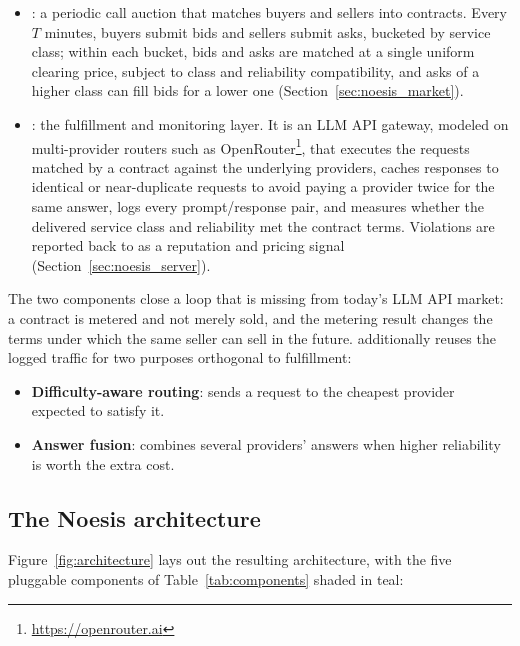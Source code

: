 \begin{itemize}
  \item \textbf{\NoesisMarket}: a periodic call auction that matches buyers
    and sellers into contracts. Every $T$ minutes, buyers submit bids and
    sellers submit asks, bucketed by service class; within each bucket, bids
    and asks are matched at a single uniform clearing price, subject to class
    and reliability compatibility, and asks of a higher class can fill bids
    for a lower one (Section~\ref{sec:noesis_market}).

  \item \textbf{\NoesisServer}: the fulfillment and monitoring layer. It is
    an LLM API gateway, modeled on multi-provider routers such as
    OpenRouter\footnote{\url{https://openrouter.ai}}, that executes the
    requests matched by a \NoesisMarket{} contract against the underlying
    providers, caches responses to identical or near-duplicate requests to
    avoid paying a provider twice for the same answer, logs every
    prompt/response pair, and measures whether the delivered service
    class and reliability met the contract terms. Violations are
    reported back to \NoesisMarket{} as a reputation and pricing signal
    (Section~\ref{sec:noesis_server}).
\end{itemize}

The two components close a loop that is missing from today's LLM API
market: a contract is metered and not merely sold, and the metering
result changes the terms under which the same seller can sell in the
future. \NoesisServer{} additionally reuses the logged traffic for two
purposes orthogonal to fulfillment:

\begin{itemize}
  \item \textbf{Difficulty-aware routing}: sends a request to the cheapest
    provider expected to satisfy it.
  \item \textbf{Answer fusion}: combines several providers' answers when
    higher reliability is worth the extra cost.
\end{itemize}

\subsection{The Noesis architecture}
\label{sec:modularity}

Figure~\ref{fig:architecture} lays out the resulting architecture, with the
five pluggable components of Table~\ref{tab:components} shaded in teal:

